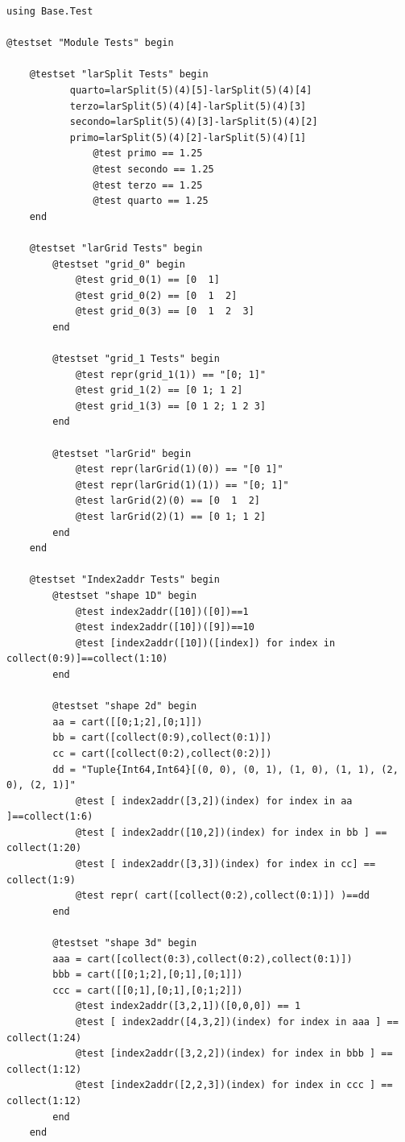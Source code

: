 \documentclass{article}
\begin{document}
\begin{flushleft}\small
\begin{list}{}{}\item
\begin{Verbatim}[tabsize=4]
using Base.Test

@testset "Module Tests" begin

	@testset "larSplit Tests" begin
           quarto=larSplit(5)(4)[5]-larSplit(5)(4)[4]
           terzo=larSplit(5)(4)[4]-larSplit(5)(4)[3]
           secondo=larSplit(5)(4)[3]-larSplit(5)(4)[2]
           primo=larSplit(5)(4)[2]-larSplit(5)(4)[1]    
               @test primo == 1.25
               @test secondo == 1.25
               @test terzo == 1.25
               @test quarto == 1.25
	end

	@testset "larGrid Tests" begin
		@testset "grid_0" begin
			@test grid_0(1) == [0  1]
			@test grid_0(2) == [0  1  2]
			@test grid_0(3) == [0  1  2  3]
		end
   
		@testset "grid_1 Tests" begin
			@test repr(grid_1(1)) == "[0; 1]"
			@test grid_1(2) == [0 1; 1 2]
			@test grid_1(3) == [0 1 2; 1 2 3]
		end
   
		@testset "larGrid" begin
			@test repr(larGrid(1)(0)) == "[0 1]"
			@test repr(larGrid(1)(1)) == "[0; 1]"
			@test larGrid(2)(0) == [0  1  2]
			@test larGrid(2)(1) == [0 1; 1 2]
		end
	end 

	@testset "Index2addr Tests" begin
		@testset "shape 1D" begin
			@test index2addr([10])([0])==1
			@test index2addr([10])([9])==10
			@test [index2addr([10])([index]) for index in collect(0:9)]==collect(1:10)
		end

		@testset "shape 2d" begin
		aa = cart([[0;1;2],[0;1]])
		bb = cart([collect(0:9),collect(0:1)])
		cc = cart([collect(0:2),collect(0:2)])
		dd = "Tuple{Int64,Int64}[(0, 0), (0, 1), (1, 0), (1, 1), (2, 0), (2, 1)]"
			@test [ index2addr([3,2])(index) for index in aa ]==collect(1:6)
			@test [ index2addr([10,2])(index) for index in bb ] == collect(1:20)
			@test [ index2addr([3,3])(index) for index in cc] == collect(1:9)
			@test repr( cart([collect(0:2),collect(0:1)]) )==dd
		end

		@testset "shape 3d" begin
		aaa = cart([collect(0:3),collect(0:2),collect(0:1)])
		bbb = cart([[0;1;2],[0;1],[0;1]])
		ccc = cart([[0;1],[0;1],[0;1;2]])
			@test index2addr([3,2,1])([0,0,0]) == 1
			@test [ index2addr([4,3,2])(index) for index in aaa ] == collect(1:24)
			@test [index2addr([3,2,2])(index) for index in bbb ] == collect(1:12)
			@test [index2addr([2,2,3])(index) for index in ccc ] == collect(1:12)
		end
	end


\end{Verbatim}
\end{list}
\end{flushleft}
\end{document}
